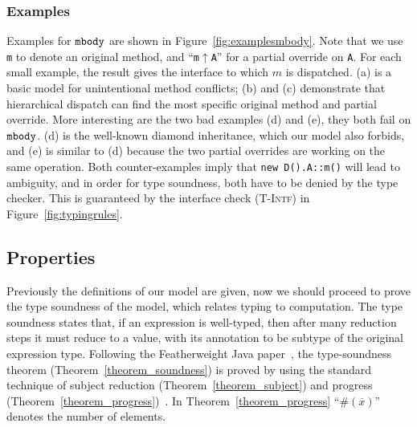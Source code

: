 \subsubsection{Examples}

Examples for $\texttt{mbody}$ are shown in Figure~\ref{fig:examplesmbody}. Note that we use \lstinline|m| to denote an original method, and ``\lstinline|m|$\uparrow$\lstinline|A|'' for a partial override on \lstinline|A|. For each small example, the result
gives the interface to which $m$ is dispatched. (a) is a basic model for unintentional method conflicts; (b) and (c) demonstrate
that hierarchical dispatch can find the most specific original method and partial override. More interesting are the two bad examples
(d) and (e), they both fail on $\texttt{mbody}$. (d) is the well-known diamond inheritance, which our model also forbids, and (e) is similar to
(d) because the two partial overrides are working on the same operation. Both counter-examples imply that \lstinline|new D().A::m()| will
lead to ambiguity, and in order for type soundness, both have to be denied by the type checker. This is guaranteed by the interface check
\textsc{(T-Intf)} in Figure~\ref{fig:typingrules}.

\subsection{Properties}
Previously the definitions of our model are given, now we should proceed to prove the type soundness of 
the model, which relates typing to computation. The type soundness states that, if an expression is 
well-typed, then after many reduction steps it must reduce to a value, with its annotation to be subtype of the original expression type.
Following the Featherweight Java paper~\cite{Igarashi01FJ}, the type-soundness theorem 
(Theorem~\ref{theorem_soundness}) is proved by using the standard technique of subject reduction (Theorem~\ref{theorem_subject})
and progress (Theorem~\ref{theorem_progress})~\cite{Wright1994}. In Theorem~\ref{theorem_progress} ``$\#(\overline{x})$'' denotes the number of
elements.

